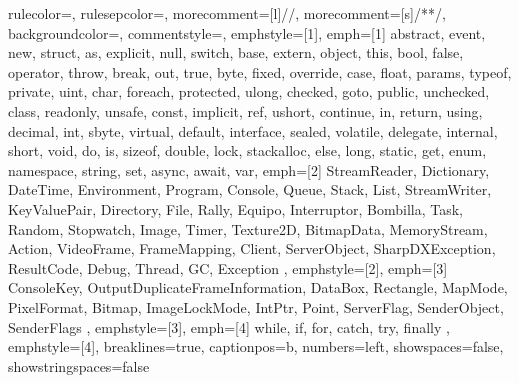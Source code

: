 {
	rulecolor=\color{blue},
	rulesepcolor=\color{blue},
	morecomment=[l]{//},
	morecomment=[s]{/*}{*/},
	backgroundcolor=\color{backcolour},   
	commentstyle=\color{codegreen},
	emphstyle=[1]\color{darkblue},
	emph=[1]
	{ 	abstract, event, new, struct,
		as, explicit, null, switch,
		base, extern, object, this,
		bool, false, operator, throw,
		break, out, true,
		byte, fixed, override,
		case, float, params, typeof,
		private, uint,
		char, foreach, protected, ulong,
		checked, goto, public, unchecked,
		class, readonly, unsafe,
		const, implicit, ref, ushort,
		continue, in, return, using,
		decimal, int, sbyte, virtual,
		default, interface, sealed, volatile,
		delegate, internal, short, void,
		do, is, sizeof,
		double, lock, stackalloc,
		else, long, static, get,
		enum, namespace, string, set,
		async, await, var},
	emph=[2]
	{	StreamReader, Dictionary, DateTime, Environment,
		Program, Console, Queue, Stack,
		List, StreamWriter, KeyValuePair, Directory,
		File, Rally, Equipo, Interruptor,
		Bombilla, Task, Random, Stopwatch,
		Image, Timer, Texture2D, BitmapData,
		MemoryStream, Action, VideoFrame, FrameMapping,
		Client, ServerObject, SharpDXException, ResultCode,
		Debug, Thread, GC, Exception
	},
	emphstyle=[2]\color{lightgreenkeywords},
	emph=[3]
	{	ConsoleKey, OutputDuplicateFrameInformation, DataBox, Rectangle,
		MapMode, PixelFormat, Bitmap, ImageLockMode,
		IntPtr, Point, ServerFlag, SenderObject,
		SenderFlags
	},
	emphstyle=[3]\color{yellowgreenkeywords},
	emph=[4]
	{	while, if, for, catch, 
		try, finally
	},
	emphstyle=[4]\color{codepurple},
	breaklines=true,                 
	captionpos=b,                                
	numbers=left,                                 
	showspaces=false,                
	showstringspaces=false
}

